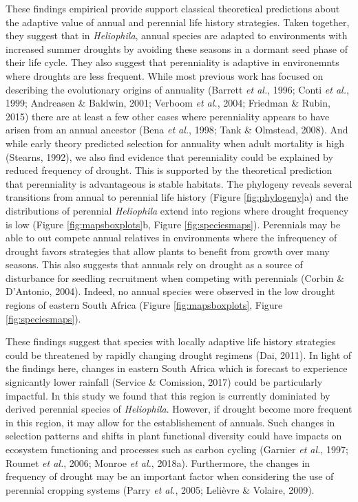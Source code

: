\documentclass[man,floatsintext]{apa6}
\theoremstyle{definition}
\theoremstyle{definition}
\theoremstyle{definition}
\theoremstyle{remark}
\begin{document}
These findings empirical provide support classical theoretical
predictions about the adaptive value of annual and perennial life
history strategies. Taken together, they suggest that in
\emph{Heliophila}, annual species are adapted to environments with
increased summer droughts by avoiding these seasons in a dormant seed
phase of their life cycle. They also suggest that perenniality is
adaptive in environemnts where droughts are less frequent. While most
previous work has focused on describing the evolutionary origins of
annuality (Barrett \emph{et al.}, 1996; Conti \emph{et al.}, 1999;
Andreasen \& Baldwin, 2001; Verboom \emph{et al.}, 2004; Friedman \&
Rubin, 2015) there are at least a few other cases where perenniality
appears to have arisen from an annual ancestor (Bena \emph{et al.},
1998; Tank \& Olmstead, 2008). And while early theory predicted
selection for annuality when adult mortality is high (Stearns, 1992), we
also find evidence that perenniality could be explained by reduced
frequency of drought. This is supported by the theoretical prediction
that perenniality is advantageous is stable habitats. The phylogeny
reveals several transitions from annual to perennial life history
(Figure \ref{fig:phylogeny}a) and the distributions of perennial
\emph{Heliophila} extend into regions where drought frequency is low
(Figure \ref{fig:mapsboxplots}b, Figure \ref{fig:speciesmaps}).
Perennials may be able to out compete annual relatives in environments
where the infrequency of drought favors strategies that allow plants to
benefit from growth over many seasons. This also suggests that annuals
rely on drought as a source of disturbance for seedling recruitment when
competing with perennials (Corbin \& D'Antonio, 2004). Indeed, no annual
species were observed in the low drought regions of eastern South Africa
(Figure \ref{fig:mapsboxplots}, Figure \ref{fig:speciesmaps}).

These findings suggest that species with locally adaptive life history
strategies could be threatened by rapidly changing drought regimens
(Dai, 2011). In light of the findings here, changes in eastern South
Africa which is forecast to experience signicantly lower rainfall
(Service \& Comission, 2017) could be particularly impactful. In this
study we found that this region is currently dominiated by derived
perennial species of \emph{Heliophila}. However, if drought become more
frequent in this region, it may allow for the establishement of annuals.
Such changes in selection patterns and shifts in plant functional
diversity could have impacts on ecosystem functioning and processes such
as carbon cycling (Garnier \emph{et al.}, 1997; Roumet \emph{et al.},
2006; Monroe \emph{et al.}, 2018a). Furthermore, the changes in
frequency of drought may be an important factor when considering the use
of perennial cropping systems (Parry \emph{et al.}, 2005; Lelièvre \&
Volaire, 2009).
\end{document}
